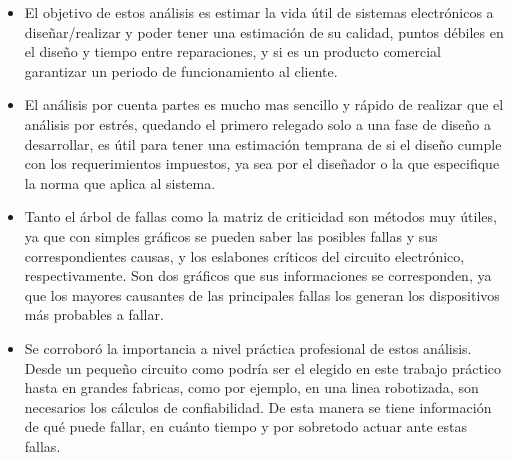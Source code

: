 \documentclass{article}
\begin{document}
\begin{itemize}
	\item El objetivo de estos análisis es estimar la vida útil de sistemas electrónicos a diseñar/realizar y poder tener una estimación de su calidad, puntos débiles en el diseño y tiempo entre reparaciones, y si es un producto comercial garantizar un periodo de funcionamiento al cliente.

\item El análisis por cuenta partes es mucho mas sencillo y rápido de realizar que el análisis por estrés, quedando el primero relegado solo a una fase de diseño a desarrollar, es útil para tener una estimación temprana de si el diseño cumple con los requerimientos impuestos, ya sea por el diseñador o la que especifique la norma que aplica al sistema.

	\item Tanto el árbol de fallas como la matriz de criticidad son métodos muy útiles, ya que con simples gráficos se pueden saber las posibles fallas y sus correspondientes causas, y los eslabones críticos del circuito electrónico, respectivamente. Son dos gráficos que sus informaciones se corresponden, ya que los mayores causantes de las principales fallas los generan los dispositivos más probables a fallar. 


  \item Se corroboró la importancia a nivel práctica profesional de estos análisis. Desde un pequeño circuito como podría ser el elegido en este trabajo práctico hasta en grandes fabricas, como por ejemplo, en una linea robotizada, son necesarios los cálculos de confiabilidad. De esta manera se tiene información de qué puede fallar, en cuánto tiempo y por sobretodo actuar ante estas fallas.
\end{itemize}
\end{document}
